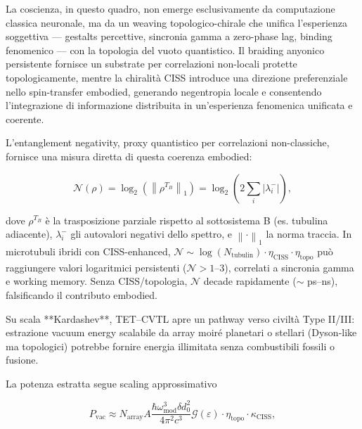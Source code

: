 \documentclass[11pt,a4paper]{article}
\theoremstyle{plain}
\theoremstyle{definition}
\begin{document}
\vspace{0.3cm}

La coscienza, in questo quadro, non emerge esclusivamente da computazione classica neuronale, ma da un weaving topologico-chirale che unifica l'esperienza soggettiva --- gestalts percettive, sincronia gamma a zero-phase lag, binding fenomenico --- con la topologia del vuoto quantistico. Il braiding anyonico persistente fornisce un substrate per correlazioni non-locali protette topologicamente, mentre la chiralità CISS introduce una direzione preferenziale nello spin-transfer embodied, generando negentropia locale e consentendo l'integrazione di informazione distribuita in un'esperienza fenomenica unificata e coerente.

\vspace{0.3cm}

L'entanglement negativity, proxy quantistico per correlazioni non-classiche, fornisce una misura diretta di questa coerenza embodied:

\begin{equation}
\mathcal{N}(\rho) = \log_2 \left( \left\| \rho^{T_B} \right\|_1 \right) = \log_2 \left( 2 \sum_i |\lambda_i^-| \right),
\label{eq:ent-negativity}
\end{equation}

dove $\rho^{T_B}$ è la trasposizione parziale rispetto al sottosistema B (es. tubulina adiacente), $\lambda_i^-$ gli autovalori negativi dello spettro, e $\left\| \cdot \right\|_1$ la norma traccia. In microtubuli ibridi con CISS-enhanced, $\mathcal{N} \sim \log(N_{\mathrm{tubulin}}) \cdot \eta_{\mathrm{CISS}} \cdot \eta_{\mathrm{topo}}$ può raggiungere valori logaritmici persistenti ($\mathcal{N} > 1$--$3$), correlati a sincronia gamma e working memory. Senza CISS/topologia, $\mathcal{N}$ decade rapidamente ($\sim$ ps–ns), falsificando il contributo embodied.

Su scala **Kardashev**, TET–CVTL apre un pathway verso civiltà Type II/III: estrazione vacuum energy scalabile da array moiré planetari o stellari (Dyson-like ma topologici) potrebbe fornire energia illimitata senza combustibili fossili o fusione. 

\vspace{0.3cm}

La potenza estratta segue scaling approssimativo

\begin{equation}
P_{\mathrm{vac}} \approx N_{\mathrm{array}} A \frac{\hbar \omega_{\mathrm{mod}}^3 \delta d_0^2}{4\pi^2 c^3} \mathcal{G}(\varepsilon) \cdot \eta_{\mathrm{topo}} \cdot \kappa_{\mathrm{CISS}},
\label{eq:vacuum-power-kardashev}
\end{equation}
\end{document}
